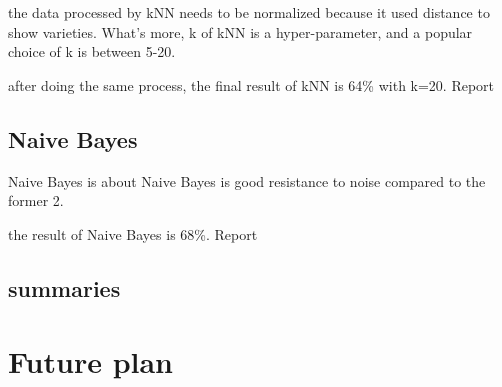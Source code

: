 \documentclass{sig-alternate}
\begin{document}
	the data processed by kNN needs to be normalized because it used distance to show varieties. 
	What's more, k of kNN is a hyper-parameter, and a popular choice of k is between 5-20.

	after doing the same process, the final result of kNN is 64\% with k=20. Report

	\subsection{Naive Bayes}
	Naive Bayes is about
	Naive Bayes is good resistance to noise compared to the former 2. 
	
	the result of Naive Bayes is 68\%. Report

	\subsection{summaries}


	\section{Future plan}
	
\end{document}
